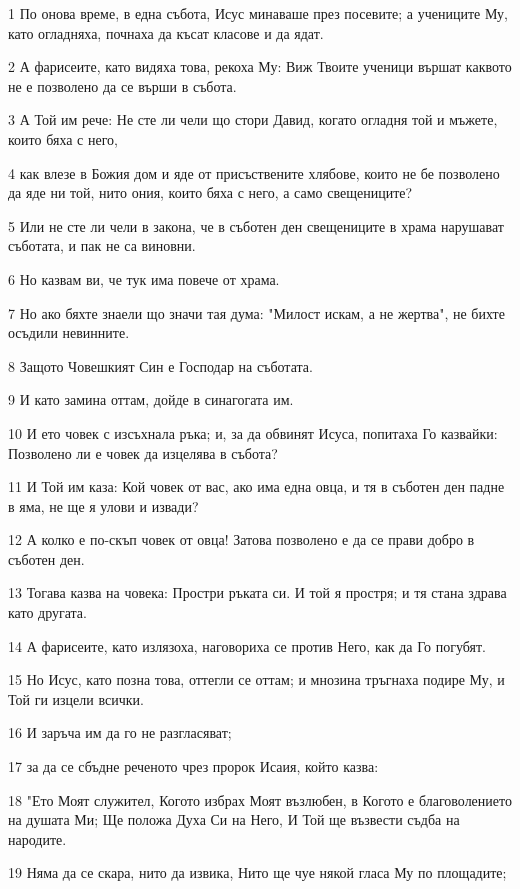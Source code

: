 \par 1 По онова време, в една събота, Исус минаваше през посевите; а учениците Му, като огладняха, почнаха да късат класове и да ядат.
\par 2 А фарисеите, като видяха това, рекоха Му: Виж Твоите ученици вършат каквото не е позволено да се върши в събота.
\par 3 А Той им рече: Не сте ли чели що стори Давид, когато огладня той и мъжете, които бяха с него,
\par 4 как влезе в Божия дом и яде от присъствените хлябове, които не бе позволено да яде ни той, нито ония, които бяха с него, а само свещениците?
\par 5 Или не сте ли чели в закона, че в съботен ден свещениците в храма нарушават съботата, и пак не са виновни.
\par 6 Но казвам ви, че тук има повече от храма.
\par 7 Но ако бяхте знаели що значи тая дума: "Милост искам, а не жертва", не бихте осъдили невинните.
\par 8 Защото Човешкият Син е Господар на съботата.
\par 9 И като замина оттам, дойде в синагогата им.
\par 10 И ето човек с изсъхнала ръка; и, за да обвинят Исуса, попитаха Го казвайки: Позволено ли е човек да изцелява в събота?
\par 11 И Той им каза: Кой човек от вас, ако има една овца, и тя в съботен ден падне в яма, не ще я улови и извади?
\par 12 А колко е по-скъп човек от овца! Затова позволено е да се прави добро в съботен ден.
\par 13 Тогава казва на човека: Простри ръката си. И той я простря; и тя стана здрава като другата.
\par 14 А фарисеите, като излязоха, наговориха се против Него, как да Го погубят.
\par 15 Но Исус, като позна това, оттегли се оттам; и мнозина тръгнаха подире Му, и Той ги изцели всички.
\par 16 И заръча им да го не разгласяват;
\par 17 за да се сбъдне реченото чрез пророк Исаия, който казва:
\par 18 "Ето Моят служител, Когото избрах Моят възлюбен, в Когото е благоволението на душата Ми; Ще положа Духа Си на Него, И Той ще възвести съдба на народите.
\par 19 Няма да се скара, нито да извика, Нито ще чуе някой гласа Му по площадите;
